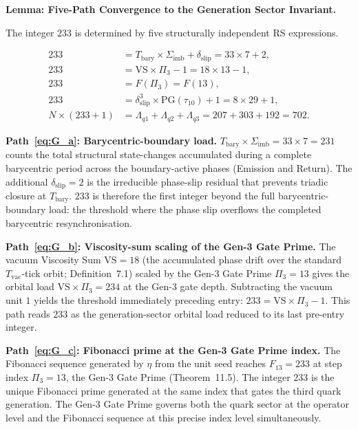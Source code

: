 \documentclass[11pt, letterpaper]{article}
\theoremstyle{definition}
\theoremstyle{plain}
\begin{document}
\begin{rsbox}
\textbf{Lemma: Five-Path Convergence to the Generation Sector Invariant.}

The integer $233$ is determined by five structurally independent RS expressions.

\begin{align}
    233 &= T_\mathrm{bary} \times \Sigma_\mathrm{imb} + \delta_\mathrm{slip}
         = 33 \times 7 + 2, \label{eq:G_a}\\
    233 &= \mathrm{VS} \times \Pi_3 - 1
         = 18 \times 13 - 1, \label{eq:G_b}\\
    233 &= F(\Pi_3) = F(13), \label{eq:G_c}\\
    233 &= \delta_\mathrm{slip}^3 \times \mathrm{PG}(\tau_{10}) + 1
         = 8 \times 29 + 1, \label{eq:G_d}\\
    N \times (233 + 1) &= \Lambda_{q1} + \Lambda_{q2} + \Lambda_{q3}
         = 207 + 303 + 192 = 702. \label{eq:G_e}
\end{align}

\textbf{Path~\eqref{eq:G_a}: Barycentric-boundary load.}
$T_\mathrm{bary} \times \Sigma_\mathrm{imb} = 33 \times 7 = 231$ counts the total
structural state-changes accumulated during a complete barycentric period across
the boundary-active phases (Emission and Return). The additional $\delta_\mathrm{slip}
= 2$ is the irreducible phase-slip residual that prevents triadic closure at
$T_\mathrm{bary}$. $233$ is therefore the first integer beyond the full
barycentric-boundary load: the threshold where the phase slip overflows the
completed barycentric resynchronisation.

\textbf{Path~\eqref{eq:G_b}: Viscosity-sum scaling of the Gen-3 Gate Prime.}
The vacuum Viscosity Sum $\mathrm{VS} = 18$ (the accumulated phase drift over the
standard $T_\mathrm{vac}$-tick orbit; Definition~7.1) scaled by the Gen-3 Gate
Prime $\Pi_3 = 13$ gives the orbital load $\mathrm{VS} \times \Pi_3 = 234$ at the
Gen-3 gate depth. Subtracting the vacuum unit $1$ yields the threshold immediately
preceding entry: $233 = \mathrm{VS} \times \Pi_3 - 1$. This path reads $233$ as the
generation-sector orbital load reduced to its last pre-entry integer.

\textbf{Path~\eqref{eq:G_c}: Fibonacci prime at the Gen-3 Gate Prime index.}
The Fibonacci sequence generated by $\eta$ from the unit seed reaches $F_{13} = 233$
at step index $\Pi_3 = 13$, the Gen-3 Gate Prime (Theorem~11.5). The integer $233$
is the unique Fibonacci prime generated at the same index that gates the third quark
generation. The Gen-3 Gate Prime governs both the quark sector at the operator level
and the Fibonacci sequence at this precise index level simultaneously.


\end{rsbox}
\end{document}
